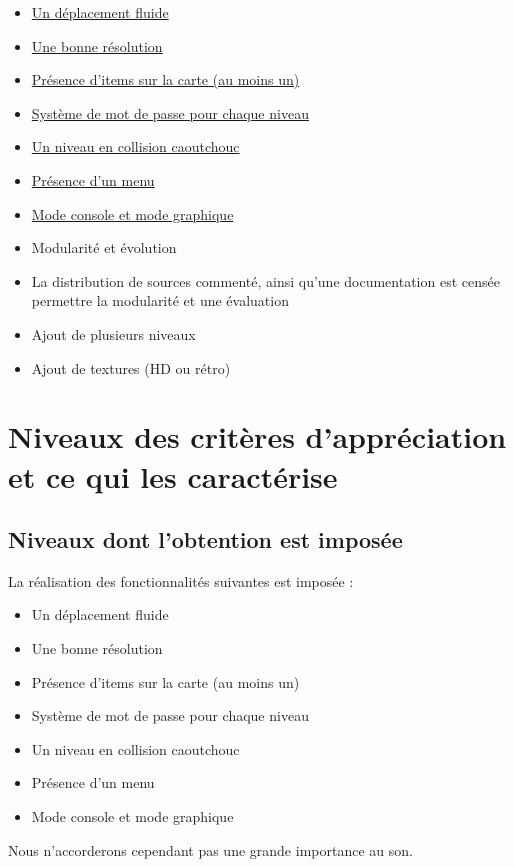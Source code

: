\documentclass[11pt]{report}
\begin{document}
			\begin{itemize}
				\item \underline{Un déplacement fluide}
				\item \underline{Une bonne résolution}
				\item \underline{Présence d’items sur la carte (au moins un)}
				\item \underline{Système de mot de passe pour chaque niveau}
				\item \underline{Un niveau en collision caoutchouc}
				\item \underline{Présence d’un menu}
				\item \underline{Mode console et mode graphique}
				\item Modularité et évolution
				\item La distribution de sources commenté, ainsi qu’une documentation est censée permettre la modularité et une évaluation
				\item Ajout de plusieurs niveaux
				\item Ajout de textures (HD ou rétro)
			\end{itemize}
		
		\section{Niveaux des critères d’appréciation et ce qui les caractérise}
		
			\subsection{Niveaux dont l’obtention est imposée}
			
				La réalisation des fonctionnalités suivantes est imposée :
				\begin{itemize}
					\item Un déplacement fluide
					\item Une bonne résolution
					\item Présence d’items sur la carte (au moins un)
					\item Système de mot de passe pour chaque niveau
					\item Un niveau en collision caoutchouc
					\item Présence d’un menu
					\item Mode console et mode graphique
				\end{itemize}
				
				Nous n’accorderons cependant pas une grande importance au son.
				
\end{document}
